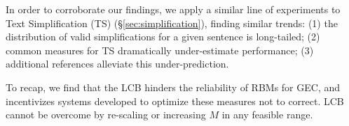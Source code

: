 \documentclass[11pt, a4paper]{article}
\newcommand{\lc}[1]{\footnote{\color{blue}LC: #1}}
\begin{document}
  In order to corroborate our findings, we apply a 
  similar line of experiments to Text Simplification (TS) (\S\ref{sec:simplification}),
  finding similar trends: (1) the distribution of valid simplifications for a given sentence is long-tailed; 
  (2) common measures for TS dramatically under-estimate performance; 
  (3) additional references alleviate this under-prediction.

  To recap, we find that the LCB hinders the reliability of RBMs for GEC,
  and incentivizes systems developed to optimize these measures not to correct. 
	LCB cannot be overcome by re-scaling or increasing $M$ in any feasible range. 
  

  
  
	
	

\end{document}

